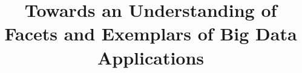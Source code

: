 \documentclass{acm_proc_article-sp}
\begin{document}
\title{Towards an Understanding of Facets and Exemplars of Big Data Applications}
%
%
%
%
%
\end{document}
